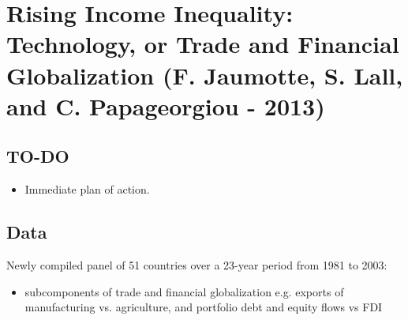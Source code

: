 \section{Rising Income Inequality: Technology, or Trade and Financial Globalization (F. Jaumotte, S. Lall, and C. Papageorgiou - 2013)}
\subsection*{TO-DO}
\begin{itemize}
  \item Immediate plan of action.
\end{itemize}
\subsection*{Data}
Newly compiled panel of 51 countries over a 23-year period from 1981 to 2003:
\begin{itemize}
\item subcomponents of trade and financial globalization e.g. exports of manufacturing vs. agriculture, and portfolio debt and equity flows vs FDI
\end{itemize}
